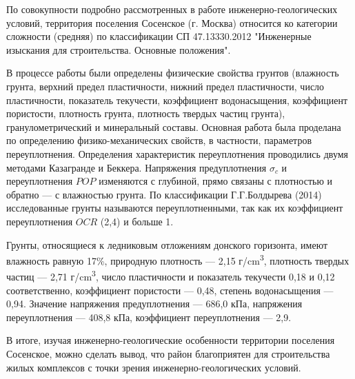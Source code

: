 По совокупности подробно рассмотренных в работе 
инженерно-геологических условий, территория поселения 
Сосенское (г. Москва) относится ко  категории сложности 
(средняя) по классификации СП 47.13330.2012 "Инженерные 
изыскания для строительства. Основные
положения"{}.

В процессе работы были определены физические свойства
грунтов (влажность грунта, верхний предел пластичности, 
нижний предел пластичности, число пластичности, 
показатель текучести, коэффициент водонасыщения, 
коэффициент пористости, плотность грунта, 
плотность твердых частиц грунта), гранулометрический и 
минеральный составы. Основная работа была проделана по 
определению физико-механических свойств, 
в частности, параметров переуплотнения. Определения 
характеристик переуплотнения проводились 
двумя методами Казагранде и Беккера. 
Напряжения предуплотнения $\sigma_c$ и переуплотнения $POP$ 
изменяются с глубиной, прямо связаны с плотностью и 
обратно --- с влажностью грунта. 
По классификации Г.Г.Болдырева (2014) 
исследованные грунты называются переуплотненными, 
так как их коэффициент переуплотнения $OCR$ (2,4) и больше 1.

Грунты, относящиеся к ледниковым 
отложениям донского горизонта, имеют влажность равную 17\%,
природную плотность --- 2,15 г/\si{\centi\meter^3}, 
плотность твердых частиц --- 2,71 г/\si{\centi\meter^3},
число пластичности и показатель текучести 0,18 и 0,12 соответственно, 
коэффициент пористости --- 0,48, степень водонасыщения --- 0,94.
Значение напряжения предуплотнения --- 686,0 кПа, 
напряжения переуплотнения --- 408,8 кПа,
коэффициент переуплотнения — 2,9.

В итоге, изучая инженерно-геологические особенности территории поселения Сосенское, 
можно сделать вывод, что район благоприятен для строительства жилых комплексов 
с точки зрения инженерно-геологических условий. 